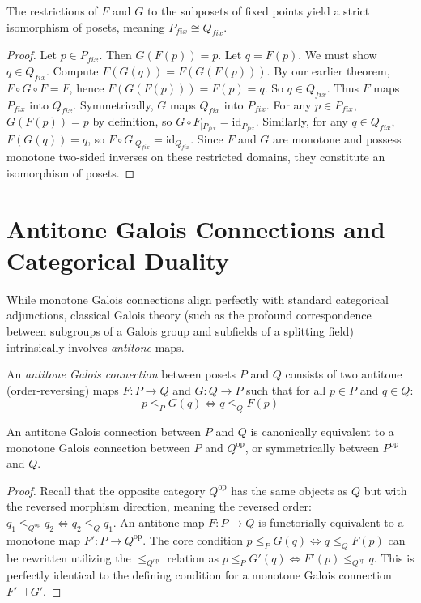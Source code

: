 \begin{theorem}
The restrictions of $F$ and $G$ to the subposets of fixed points yield a strict isomorphism of posets, meaning $P_{fix} \cong Q_{fix}$.
\end{theorem}
\begin{proof}
Let $p \in P_{fix}$. Then $G(F(p)) = p$. Let $q = F(p)$. We must show $q \in Q_{fix}$.
Compute $F(G(q)) = F(G(F(p)))$. By our earlier theorem, $F \circ G \circ F = F$, hence $F(G(F(p))) = F(p) = q$. So $q \in Q_{fix}$.
Thus $F$ maps $P_{fix}$ into $Q_{fix}$. Symmetrically, $G$ maps $Q_{fix}$ into $P_{fix}$.
For any $p \in P_{fix}$, $G(F(p)) = p$ by definition, so $G \circ F_{|P_{fix}} = \text{id}_{P_{fix}}$.
Similarly, for any $q \in Q_{fix}$, $F(G(q)) = q$, so $F \circ G_{|Q_{fix}} = \text{id}_{Q_{fix}}$.
Since $F$ and $G$ are monotone and possess monotone two-sided inverses on these restricted domains, they constitute an isomorphism of posets.
\end{proof}

\section{Antitone Galois Connections and Categorical Duality}

While monotone Galois connections align perfectly with standard categorical adjunctions, classical Galois theory (such as the profound correspondence between subgroups of a Galois group and subfields of a splitting field) intrinsically involves \emph{antitone} maps.

\begin{definition}
An \emph{antitone Galois connection} between posets $P$ and $Q$ consists of two antitone (order-reversing) maps $F: P \to Q$ and $G: Q \to P$ such that for all $p \in P$ and $q \in Q$:
\begin{equation}
    p \leq_P G(q) \iff q \leq_Q F(p)
\end{equation}
\end{definition}

\begin{lemma}
An antitone Galois connection between $P$ and $Q$ is canonically equivalent to a monotone Galois connection between $P$ and $Q^{\text{op}}$, or symmetrically between $P^{\text{op}}$ and $Q$.
\end{lemma}
\begin{proof}
Recall that the opposite category $Q^{\text{op}}$ has the same objects as $Q$ but with the reversed morphism direction, meaning the reversed order: $q_1 \leq_{Q^{\text{op}}} q_2 \iff q_2 \leq_Q q_1$.
An antitone map $F: P \to Q$ is functorially equivalent to a monotone map $F': P \to Q^{\text{op}}$.
The core condition $p \leq_P G(q) \iff q \leq_Q F(p)$ can be rewritten utilizing the $\leq_{Q^{\text{op}}}$ relation as $p \leq_P G'(q) \iff F'(p) \leq_{Q^{\text{op}}} q$.
This is perfectly identical to the defining condition for a monotone Galois connection $F' \dashv G'$.
\end{proof}

